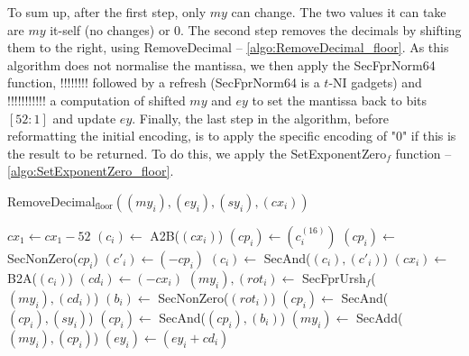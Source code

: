\documentclass[runningheads]{llncs}
\begin{document}
        To sum up, after the first step, only $my$ can change. The two values it can take are $my$ it-self (no changes) or $0$.
        The second step removes the decimals by shifting them to the right, using RemoveDecimal -- \autoref{algo:RemoveDecimal_floor}. 
        As this algorithm does not normalise the mantissa, we then apply the SecFprNorm64 function, !!!!!!!! followed by a refresh (SecFprNorm64 is a $t$-NI gadgets) and !!!!!!!!!!! a computation of shifted $my$ and $ey$ to set the mantissa back to bits $[52:1]$ and update $ey$.
        Finally, the last step in the algorithm, before reformatting the initial encoding, is to apply the specific encoding of "0" if this is the result to be returned.
        To do this, we apply the SetExponentZero$_f$ function -- \autoref{algo:SetExponentZero_floor}. 
        \begin{algorithm}
            \caption{RemoveDecimal$_{\text{floor}}((my_i), (ey_i), (sy_i), (cx_i))$}
            \label{algo:RemoveDecimal_floor}
            $cx_1 \leftarrow cx_1 - 52$\;%
            $(c_i) \leftarrow$ A2B($(cx_i)$)\;
            $(cp_i) \leftarrow (c_i^{(16)})$\;
            $(cp_i) \leftarrow$ SecNonZero($cp_i$)\;
            $(c'_i) \leftarrow (- cp_i)$\;%
            $(c_i) \leftarrow$ SecAnd($(c_i), (c'_i)$)\;
            $(cx_i) \leftarrow$ B2A($(c_i)$)\;
            $(cd_i) \leftarrow (-cx_i)$\;
            $(my_i), (rot_i) \leftarrow$ SecFprUrsh$_f$($(my_i), (cd_i)$)\;%
            $(b_i) \leftarrow$ SecNonZero($(rot_i)$)\;%
            $(cp_i) \leftarrow$ SecAnd($(cp_i), (sy_i)$)\; 
            $(cp_i) \leftarrow$ SecAnd($(cp_i), (b_i)$)\; 
            $(my_i)\leftarrow$ SecAdd($(my_i), (cp_i)$)\;%
            $(ey_i) \leftarrow (ey_i + cd_i)$\; 
          \;
          \end{algorithm}
\end{document}
